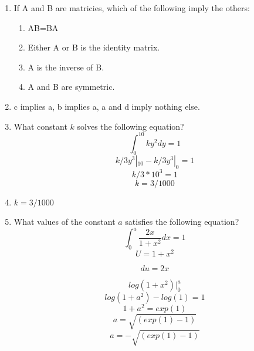 \documentclass[11pt]{article}
\begin{document}
\begin{enumerate}
\begin{enumerate}
\item[] It is 4 

\item What $x$ would make the following matrix singular?
$$\begin{bmatrix}
1&3\\ x&2
\end{bmatrix}$$
\item[] $1*2-3x=0$, $\rightarrow \ x=2/3$
\end{enumerate}

\vspace{.2in}

\item If A and B are matricies, which of the following imply the others: 
\begin{enumerate}
\item AB=BA
\item Either A or B is the identity matrix.
\item A is the inverse of B.
\item A and B are symmetric.
\end{enumerate}
\item[]  c implies a, b implies a, a and d imply nothing else.

\item What constant $k$ solves the following equation?
$$\int_0^{10} ky^2dy=1$$
$$k/3y^3|_{10}-k/3y^3|_0=1$$
$$k/3* 10^3=1$$
$$k =3/1000$$
\item[] $k=3/1000$

\item What values of the constant $a$ satisfies the following equation?
$$\int_0^a \frac{2x}{1+x^2}dx=1$$
$$ U = 1+x^2$$

$$ du= 2x$$

$$log(1+x^2)|_0^a  $$
$$log(1+a^2)-log(1)=1$$
$$ 1+a^2=exp(1)$$
$$a=\sqrt{(exp(1)-1)}$$
$$a=-\sqrt{(exp(1)-1)}$$
\end{enumerate}
\end{document}
